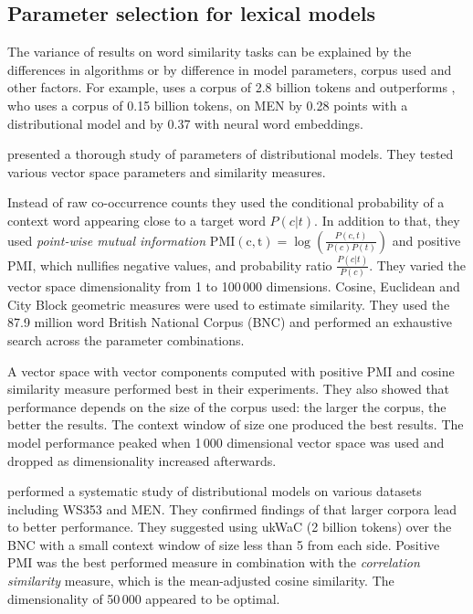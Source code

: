 \subsection{Parameter selection for lexical models}
\label{sec:parameter-selection-intro}

The variance of results on word similarity tasks can be explained by the differences in algorithms or by difference in model parameters, corpus used and other factors. For example,  uses a corpus of 2.8 billion tokens and outperforms , who uses a corpus of 0.15 billion tokens, on MEN by 0.28 points with a distributional model and by 0.37 with neural word embeddings.

 presented a thorough study of parameters of distributional models. They tested various vector space parameters and similarity measures.

Instead of raw co-occurrence counts they used the conditional probability of a context word appearing close to a target word $P(c|t)$. In addition to that, they used \emph{point-wise mutual information} $\operatorname{PMI(c,t)} = \log\left(\frac{P(c,t)}{P(c)P(t)}\right)$ and positive PMI, which nullifies negative values, and probability ratio $\frac{P(c|t)}{P(c)}$. They varied the vector space dimensionality from 1 to 100\,000 dimensions.  Cosine, Euclidean and City Block geometric measures were used to estimate similarity. They used the 87.9 million word British National Corpus (BNC) and performed an exhaustive search across the parameter combinations.

A vector space with vector components computed with positive PMI and cosine similarity measure performed best in their experiments. They also showed that performance depends on the size of the corpus used: the larger the corpus, the better the results. The context window of size one produced the best results. The model performance peaked when 1\,000 dimensional vector space was used and dropped as dimensionality increased  afterwards.

 performed a systematic study of distributional models on various datasets including WS353 and MEN. They confirmed findings of  that larger corpora lead to better performance. They suggested using ukWaC (2 billion tokens) over the BNC with a small context window of size less than 5 from each side. Positive PMI was the best performed measure in combination with the \emph{correlation similarity} measure, which is the mean-adjusted cosine similarity. The dimensionality of 50\,000 appeared to be optimal.

